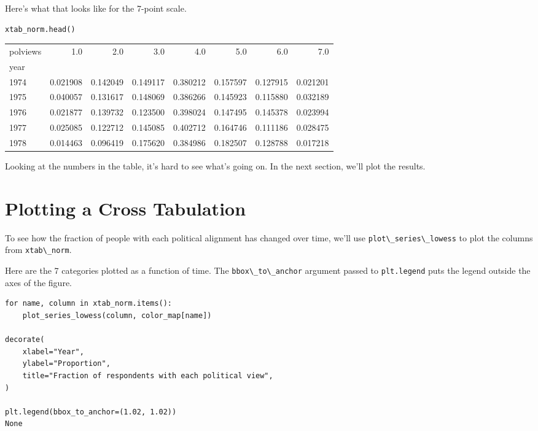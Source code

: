 Here's what that looks like for the 7-point scale.

\begin{lstlisting}[]
xtab_norm.head()
\end{lstlisting}

\begin{tabular}{lrrrrrrr}
\midrule
polviews &       1.0 &       2.0 &       3.0 &       4.0 &       5.0 &       6.0 &       7.0 \\
year &           &           &           &           &           &           &           \\
\midrule
1974 &  0.021908 &  0.142049 &  0.149117 &  0.380212 &  0.157597 &  0.127915 &  0.021201 \\
1975 &  0.040057 &  0.131617 &  0.148069 &  0.386266 &  0.145923 &  0.115880 &  0.032189 \\
1976 &  0.021877 &  0.139732 &  0.123500 &  0.398024 &  0.147495 &  0.145378 &  0.023994 \\
1977 &  0.025085 &  0.122712 &  0.145085 &  0.402712 &  0.164746 &  0.111186 &  0.028475 \\
1978 &  0.014463 &  0.096419 &  0.175620 &  0.384986 &  0.182507 &  0.128788 &  0.017218 \\
\midrule
\end{tabular}

Looking at the numbers in the table, it's hard to see what's going on.
In the next section, we'll plot the results.

\hypertarget{plotting-a-cross-tabulation}{%
\section{Plotting a Cross
Tabulation}\label{plotting-a-cross-tabulation}}

To see how the fraction of people with each political alignment has
changed over time, we'll use
\passthrough{\lstinline!plot\_series\_lowess!} to plot the columns from
\passthrough{\lstinline!xtab\_norm!}.

Here are the 7 categories plotted as a function of time. The
\passthrough{\lstinline!bbox\_to\_anchor!} argument passed to
\passthrough{\lstinline!plt.legend!} puts the legend outside the axes of
the figure.

\begin{lstlisting}[]
for name, column in xtab_norm.items():
    plot_series_lowess(column, color_map[name])

decorate(
    xlabel="Year",
    ylabel="Proportion",
    title="Fraction of respondents with each political view",
)

plt.legend(bbox_to_anchor=(1.02, 1.02))
None
\end{lstlisting}

